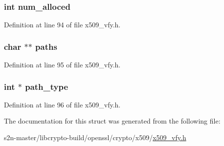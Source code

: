 \subsubsection[{\texorpdfstring{num\+\_\+alloced}{num_alloced}}]{\setlength{\rightskip}{0pt plus 5cm}int num\+\_\+alloced}\hypertarget{structx509__file__st_af85b54cafa6bd09c1263cb1c97d62f66}{}\label{structx509__file__st_af85b54cafa6bd09c1263cb1c97d62f66}


Definition at line 94 of file x509\+\_\+vfy.\+h.

\subsubsection[{\texorpdfstring{paths}{paths}}]{\setlength{\rightskip}{0pt plus 5cm}char $\ast$$\ast$ paths}\hypertarget{structx509__file__st_ae2882836845d3815a9b4c33d399c6199}{}\label{structx509__file__st_ae2882836845d3815a9b4c33d399c6199}


Definition at line 95 of file x509\+\_\+vfy.\+h.

\subsubsection[{\texorpdfstring{path\+\_\+type}{path_type}}]{\setlength{\rightskip}{0pt plus 5cm}int $\ast$ path\+\_\+type}\hypertarget{structx509__file__st_a0d65f550882b47978bdf8f92601ce9ae}{}\label{structx509__file__st_a0d65f550882b47978bdf8f92601ce9ae}


Definition at line 96 of file x509\+\_\+vfy.\+h.



The documentation for this struct was generated from the following file\+:\begin{DoxyCompactItemize}
\item 
s2n-\/master/libcrypto-\/build/openssl/crypto/x509/\hyperlink{crypto_2x509_2x509__vfy_8h}{x509\+\_\+vfy.\+h}\end{DoxyCompactItemize}
